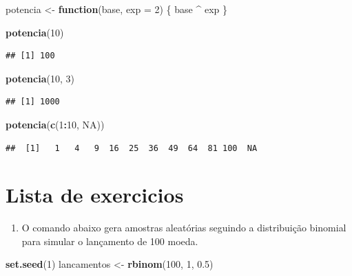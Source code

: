 \documentclass[
]{book}
\newenvironment{Shaded}{\begin{snugshade}}{\end{snugshade}}
\newcommand{\AttributeTok}[1]{\textcolor[rgb]{0.13,0.29,0.53}{#1}}
\newcommand{\ConstantTok}[1]{\textcolor[rgb]{0.56,0.35,0.01}{#1}}
\newcommand{\ControlFlowTok}[1]{\textcolor[rgb]{0.13,0.29,0.53}{\textbf{#1}}}
\newcommand{\DecValTok}[1]{\textcolor[rgb]{0.00,0.00,0.81}{#1}}
\newcommand{\FloatTok}[1]{\textcolor[rgb]{0.00,0.00,0.81}{#1}}
\newcommand{\FunctionTok}[1]{\textcolor[rgb]{0.13,0.29,0.53}{\textbf{#1}}}
\newcommand{\NormalTok}[1]{#1}
\newcommand{\OtherTok}[1]{\textcolor[rgb]{0.56,0.35,0.01}{#1}}
\newcommand{\SpecialCharTok}[1]{\textcolor[rgb]{0.81,0.36,0.00}{\textbf{#1}}}
\providecommand{\tightlist}{%
  \setlength{\itemsep}{0pt}\setlength{\parskip}{0pt}}
\begin{document}
\begin{Shaded}
\begin{Highlighting}[]
\NormalTok{potencia }\OtherTok{\textless{}{-}} \ControlFlowTok{function}\NormalTok{(base, }\AttributeTok{exp =} \DecValTok{2}\NormalTok{) \{}
\NormalTok{  base }\SpecialCharTok{\^{}}\NormalTok{ exp}
\NormalTok{\}}

\FunctionTok{potencia}\NormalTok{(}\DecValTok{10}\NormalTok{)}
\end{Highlighting}
\end{Shaded}

\begin{verbatim}
## [1] 100
\end{verbatim}

\begin{Shaded}
\begin{Highlighting}[]
\FunctionTok{potencia}\NormalTok{(}\DecValTok{10}\NormalTok{, }\DecValTok{3}\NormalTok{)}
\end{Highlighting}
\end{Shaded}

\begin{verbatim}
## [1] 1000
\end{verbatim}

\begin{Shaded}
\begin{Highlighting}[]
\FunctionTok{potencia}\NormalTok{(}\FunctionTok{c}\NormalTok{(}\DecValTok{1}\SpecialCharTok{:}\DecValTok{10}\NormalTok{, }\ConstantTok{NA}\NormalTok{))}
\end{Highlighting}
\end{Shaded}

\begin{verbatim}
##  [1]   1   4   9  16  25  36  49  64  81 100  NA
\end{verbatim}

\section{Lista de exercicios}\label{lista-de-exercicios}

\begin{enumerate}
\def\labelenumi{\arabic{enumi}.}
\tightlist
\item
  O comando abaixo gera amostras aleatórias seguindo a distribuição binomial para simular o lançamento de 100 moeda.
\end{enumerate}

\begin{Shaded}
\begin{Highlighting}[]
\FunctionTok{set.seed}\NormalTok{(}\DecValTok{1}\NormalTok{)}
\NormalTok{lancamentos }\OtherTok{\textless{}{-}} \FunctionTok{rbinom}\NormalTok{(}\DecValTok{100}\NormalTok{, }\DecValTok{1}\NormalTok{, }\FloatTok{0.5}\NormalTok{)}
\end{Highlighting}
\end{Shaded}
\end{document}

